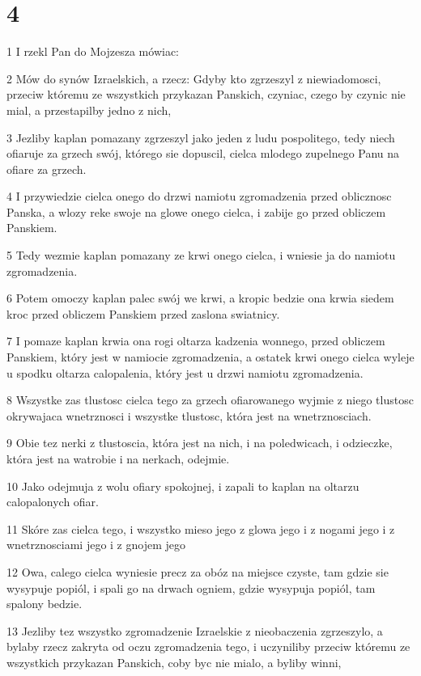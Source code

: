 \chapter{4}

\par 1 I rzekl Pan do Mojzesza mówiac:
\par 2 Mów do synów Izraelskich, a rzecz: Gdyby kto zgrzeszyl z niewiadomosci, przeciw któremu ze wszystkich przykazan Panskich, czyniac, czego by czynic nie mial, a przestapilby jedno z nich,
\par 3 Jezliby kaplan pomazany zgrzeszyl jako jeden z ludu pospolitego, tedy niech ofiaruje za grzech swój, którego sie dopuscil, cielca mlodego zupelnego Panu na ofiare za grzech.
\par 4 I przywiedzie cielca onego do drzwi namiotu zgromadzenia przed oblicznosc Panska, a wlozy reke swoje na glowe onego cielca, i zabije go przed obliczem Panskiem.
\par 5 Tedy wezmie kaplan pomazany ze krwi onego cielca, i wniesie ja do namiotu zgromadzenia.
\par 6 Potem omoczy kaplan palec swój we krwi, a kropic bedzie ona krwia siedem kroc przed obliczem Panskiem przed zaslona swiatnicy.
\par 7 I pomaze kaplan krwia ona rogi oltarza kadzenia wonnego, przed obliczem Panskiem, który jest w namiocie zgromadzenia, a ostatek krwi onego cielca wyleje u spodku oltarza calopalenia, który jest u drzwi namiotu zgromadzenia.
\par 8 Wszystke zas tlustosc cielca tego za grzech ofiarowanego wyjmie z niego tlustosc okrywajaca wnetrznosci i wszystke tlustosc, która jest na wnetrznosciach.
\par 9 Obie tez nerki z tlustoscia, która jest na nich, i na poledwicach, i odzieczke, która jest na watrobie i na nerkach, odejmie.
\par 10 Jako odejmuja z wolu ofiary spokojnej, i zapali to kaplan na oltarzu calopalonych ofiar.
\par 11 Skóre zas cielca tego, i wszystko mieso jego z glowa jego i z nogami jego i z wnetrznosciami jego i z gnojem jego
\par 12 Owa, calego cielca wyniesie precz za obóz na miejsce czyste, tam gdzie sie wysypuje popiól, i spali go na drwach ogniem, gdzie wysypuja popiól, tam spalony bedzie.
\par 13 Jezliby tez wszystko zgromadzenie Izraelskie z nieobaczenia zgrzeszylo, a bylaby rzecz zakryta od oczu zgromadzenia tego, i uczyniliby przeciw któremu ze wszystkich przykazan Panskich, coby byc nie mialo, a byliby winni,
